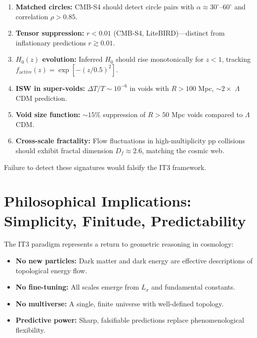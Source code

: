\documentclass[12pt,a4paper]{article}
\begin{document}
\begin{enumerate}
    \item \textbf{Matched circles:} CMB-S4 should detect circle pairs with $\alpha \approx 30^\circ\text{--}60^\circ$ and correlation $\rho > 0.85$.
    
    \item \textbf{Tensor suppression:} $r < 0.01$ (CMB-S4, LiteBIRD)---distinct from inflationary predictions $r \gtrsim 0.01$.
    
    \item \textbf{$H_0(z)$ evolution:} Inferred $H_0$ should rise monotonically for $z < 1$, tracking $f_{\mathrm{active}}(z) = \exp[-(z/0.5)^2]$.
    
    \item \textbf{ISW in super-voids:} $\Delta T/T \sim 10^{-6}$ in voids with $R > 100$ Mpc, $\sim 2\times$ $\Lambda$CDM prediction.
    
    \item \textbf{Void size function:} $\sim 15\%$ suppression of $R > 50$ Mpc voids compared to $\Lambda$CDM.
    
    \item \textbf{Cross-scale fractality:} Flow fluctuations in high-multiplicity pp collisions should exhibit fractal dimension $D_f \approx 2.6$, matching the cosmic web.
\end{enumerate}

Failure to detect these signatures would falsify the IT3 framework.

\section{Philosophical Implications: Simplicity, Finitude, Predictability}

The IT3 paradigm represents a return to geometric reasoning in cosmology:
\begin{itemize}
    \item \textbf{No new particles:} Dark matter and dark energy are effective descriptions of topological energy flow.
    \item \textbf{No fine-tuning:} All scales emerge from $L_x$ and fundamental constants.
    \item \textbf{No multiverse:} A single, finite universe with well-defined topology.
    \item \textbf{Predictive power:} Sharp, falsifiable predictions replace phenomenological flexibility.
\end{itemize}
\end{document}
